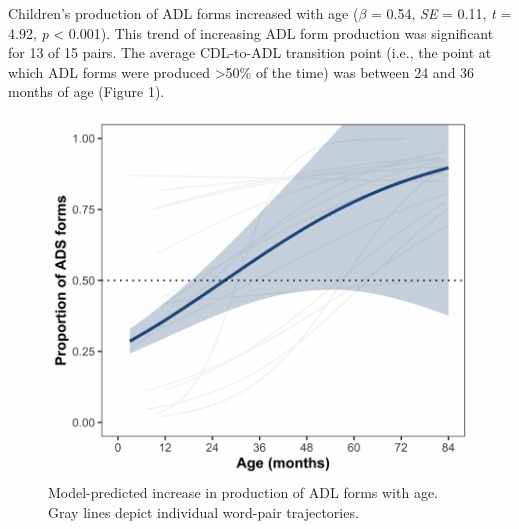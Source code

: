 \documentclass[10pt, letterpaper]{article}
\newenvironment{CodeChunk}{}{}
\begin{document}
Children's production of ADL forms increased with age (\(\beta\) = 0.54,
\emph{SE} = 0.11, \emph{t} = 4.92, \emph{p} \textless{} 0.001). This
trend of increasing ADL form production was significant for 13 of 15
pairs. The average CDL-to-ADL transition point (i.e., the point at which
ADL forms were produced \textgreater50\% of the time) was between 24 and
36 months of age (Figure 1).

\begin{CodeChunk}
\begin{figure}[h]

{\centering \includegraphics{figs/shift-timing-fig-1} 

}

\caption[Model-predicted increase in production of ADL forms with age]{Model-predicted increase in production of ADL forms with age. Gray lines depict individual word-pair trajectories.}\label{fig:shift-timing-fig}
\end{figure}
\end{CodeChunk}
\end{document}
